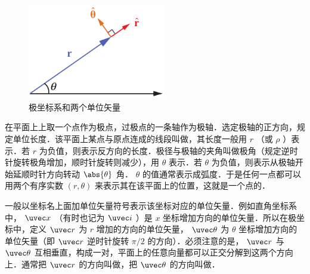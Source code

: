 
\begin{figure}[ht]
\centering
\includegraphics[width=6cm]{./figures/Polar1.pdf}
\caption{极坐标系和两个单位矢量}
\end{figure}

在平面上上取一个点作为极点，过极点的一条轴作为极轴．选定极轴的正方向，规定单位长度．该平面上某点与原点连成的线段叫做，其长度一般用 $r$ （或 $\rho$ ）表示．若 $r$ 为负值，则表示反方向的长度．极径与极轴的夹角叫做极角（规定逆时针旋转极角增加，顺时针旋转则减少），用 $\theta $ 表示．若 $\theta $ 为负值，则表示从极轴开始延顺时针方向转动 $\abs{\theta}$ 角． $\theta $ 的值通常表示成弧度．于是任何一点都可以用两个有序实数 $(r,\theta)$ 来表示其在该平面上的位置，这就是一个点的．

一般以坐标名上面加单位矢量符号表示该坐标对应的单位矢量．例如直角坐标系中， $\uvec x$ （有时也记为 $\uvec i$ ）是 $x$ 坐标增加方向的单位矢量．所以在极坐标中，定义 $\uvec r$ 为 $r$ 增加的方向的单位矢量， $\uvec \theta $ 为 $\theta $ 坐标增加方向的单位矢量（即 $\uvec r$ 逆时针旋转 $\pi/2$ 的方向）．必须注意的是， $\uvec r$ 与 $\uvec \theta$ 互相垂直，构成一对，平面上的任意向量都可以正交分解到这两个方向上．通常把 $\uvec r$ 的方向叫做，把 $\uvec \theta $ 的方向叫做．

